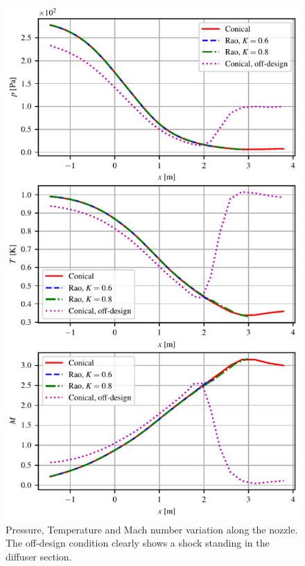 \documentclass{article}
\begin{document}




\begin{figure}[htb]
    \centering
    \includegraphics[scale=1]{../plots/pTM_vs_x.pdf}
    \caption{Pressure, Temperature and Mach number variation along the nozzle. The off-design condition clearly shows a shock standing in the diffuser section.}
\end{figure}
\end{document}
